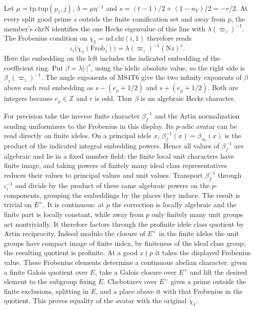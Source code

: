 Let $\mu=\mathrm{tp.tup}(\mu_i,j)$, $\lambda=\mu\eta^{-1}$
and $s=(t-1)/2+(1-n_V)/2=-r/2$. At every split good prime $z$
outside the finite ramification set and away from $p$, the member's
$\mathrm{chrN}$ identifies the one Hecke eigenvalue of this line
with $\lambda(\varpi_z)^{-1}$. The Frobenius condition on
$\chi_1=\mathrm{nd.chi}(i,1)$ therefore reads
\[
 \iota_i\bigl(\chi_1(\mathrm{Frob}_z)\bigr)
        =\lambda(\varpi_z)^{-1}(\mathrm Nz)^s .
\]
Here the embedding on the left includes the indicated embedding of the
coefficient ring. Put $\beta=\lambda|\cdot|^s$, using the idelic
absolute value, so the right side is $\beta_z(\varpi_z)^{-1}$.
The angle exponents of M84T6 give the two infinity exponents of
$\beta$ above each real embedding as
$s-(e_\rho+1/2)$ and $s+(e_\rho+1/2)$. Both are integers because
$e_\rho\in\mathbb Z$ and $r$ is odd. Thus $\beta$ is an algebraic
Hecke character.

For precision take the inverse finite character $\beta_f^{-1}$ and
the Artin normalization sending uniformizers to the Frobenius in this
display. Its $p$-adic avatar can be read directly on finite ideles.
On a principal idele $x$, $\beta_f^{-1}(x)=\beta_\infty(x)$ is
the product of the indicated integral embedding powers. Hence all
values of $\beta_f^{-1}$ are algebraic and lie in a fixed number
field: the finite local unit characters have finite image, and
taking powers of finitely many ideal class representatives reduces
their values to principal values and unit values. Transport
$\beta_f^{-1}$ through $\iota_i^{-1}$ and divide by the product
of these same algebraic powers on the $p$-components, grouping the
embeddings by the places they induce. The result is trivial on
$E^\times$. It is continuous: at $p$ the correction is locally
algebraic and the finite part is locally constant, while away
from $p$ only finitely many unit groups act nontrivially.
It therefore factors through the profinite idele class quotient
by Artin reciprocity. Indeed modulo the closure of $E^\times$ in
the finite ideles the unit groups have compact image of finite
index, by finiteness of the ideal class group; the resulting
quotient is profinite. At a good $z\nmid p$ it takes the displayed
Frobenius value. These Frobenius elements determine a continuous
abelian character: given a finite Galois quotient over $E$, take
a Galois closure over $E^+$ and lift the desired element to the
subgroup fixing $E$. Chebotarev over $E^+$ gives a prime outside
the finite exclusions, splitting in $E$, and a place above it with
that Frobenius in the quotient. This proves equality of the avatar
with the original $\chi_1$.

